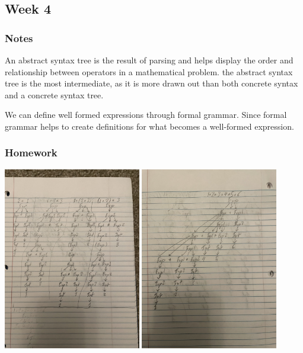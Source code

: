 \documentclass{article}
\theoremstyle{theorem}
\theoremstyle{definition}
\theoremstyle{remark}
\begin{document}
\subsection{Week 4}

\subsubsection*{Notes}

An abstract syntax tree is the result of parsing and helps display the order and relationship between operators in a mathematical problem. the abstract syntax tree is the most intermediate, as it is more drawn out than both concrete syntax and a concrete syntax tree.

We can define well formed expressions through formal grammar. Since formal grammar helps to create definitions for what becomes a well-formed expression.

\subsubsection*{Homework}

\includegraphics[width=0.45\textwidth]{HW4IMG1.jpg}
\includegraphics[width=0.45\textwidth]{HW4IMG2.jpg}
\end{document}

